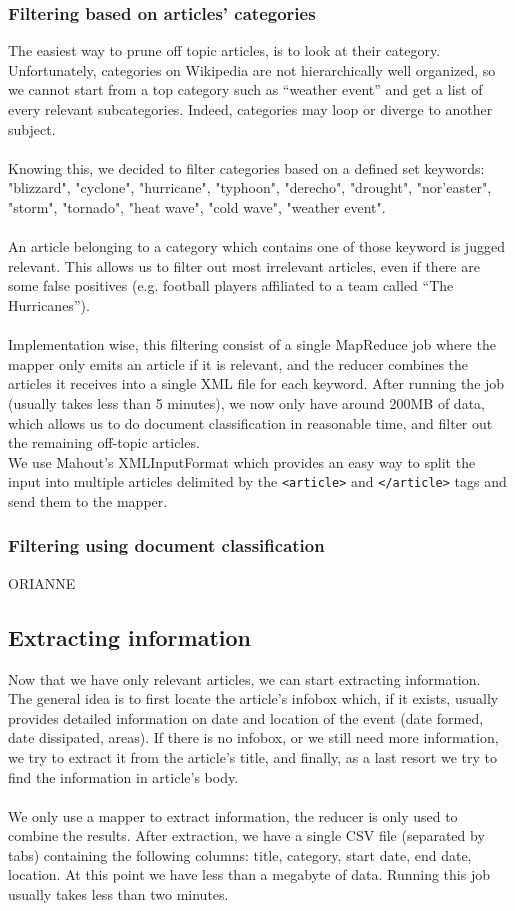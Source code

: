 \subsubsection{Filtering based on articles' categories}
The easiest way to prune off topic articles, is to look at their category. Unfortunately, categories on Wikipedia are not hierarchically well organized, so we cannot start from a top category such as ``weather event'' and get a list of every relevant subcategories. Indeed, categories may loop or diverge to another subject.\\\\
Knowing this, we decided to filter categories based on a defined set keywords: "blizzard", "cyclone", "hurricane", "typhoon", "derecho", "drought", "nor'easter", "storm", "tornado", "heat wave", "cold wave", "weather event". \\\\
An article belonging to a category which contains one of those keyword is jugged relevant. This allows us to filter out most irrelevant articles, even if there are some false positives (e.g. football players affiliated to a team called ``The Hurricanes'').\\\\
Implementation wise, this filtering consist of a single MapReduce job where the mapper only emits an article if it is relevant, and the reducer combines the articles it receives into a single XML file for each keyword. 
After running the job (usually takes less than 5 minutes), we now only have around 200MB of data, which allows us to do document classification in reasonable time, and filter out the remaining off-topic articles.\\ 
We use Mahout's XMLInputFormat which provides an easy way to split the input into multiple articles delimited by the \texttt{<article>} and \texttt{</article>} tags and send them to the mapper.
\subsubsection{Filtering using document classification}
ORIANNE
\subsection{Extracting information}
Now that we have only relevant articles, we can start extracting information. \\
The general idea is to first locate the article's infobox which, if it exists, usually provides detailed information on date and location of the event (date formed, date dissipated, areas). If there is no infobox, or we still need more information, we try to extract it from the article's title, and finally, as a last resort we try to find the information in article's body.\\\\
We only use a mapper to extract information, the reducer is only used to combine the results.
After extraction, we have a single CSV file (separated by tabs) containing the following columns: title, category, start date, end date, location. At this point we have less than a megabyte of data. Running this job usually takes less than two minutes.

